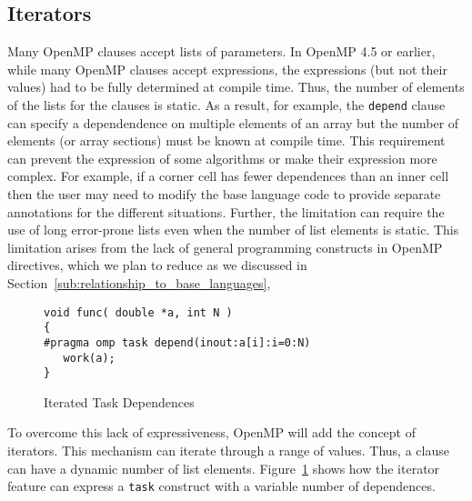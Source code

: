 \subsection{Iterators}
\label{sub:iterators}

Many OpenMP clauses accept lists of parameters. In OpenMP 4.5 or earlier, 
while many OpenMP clauses accept expressions, the expressions (but not 
their values) had to be fully determined at compile time. Thus, the number 
of elements of the lists for the clauses is static. As a result, for example,
the \texttt{depend} clause can specify a dependendence on multiple elements
of an array but the number of elements (or array sections) must be known
at compile time. This requirement can prevent the expression of some
algorithms or make their expression more complex.  For example, if a 
corner cell has fewer dependences than an inner cell then the user may need 
to modify the base language code to provide separate annotations for the
different situations. Further, the limitation can require the use of long 
error-prone lists even when the number of list elements is static. This 
limitation arises from the lack of general programming constructs in 
OpenMP directives, which we plan to reduce as we discussed in 
Section~\ref{sub:relationship_to_base_languages}, 

\begin{figure}
\begin{verbatim}
void func( double *a, int N )
{
#pragma omp task depend(inout:a[i]:i=0:N)
   work(a);
}
\end{verbatim}
\caption{Iterated Task Dependences}
\label{fig:iterators}
\end{figure}

To overcome this lack of expressiveness, OpenMP will add the concept of  
iterators. This mechanism can iterate through a range of values. Thus, a
clause can have a dynamic number of list elements. Figure~\ref{fig:iterators} 
shows how the iterator feature can express a \texttt{task} construct with a 
variable number of dependences. 
   


   

